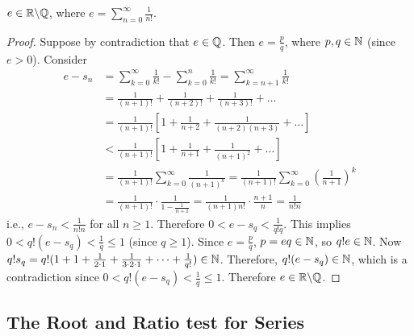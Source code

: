 \documentclass[]{article}
\begin{document}
\begin{theorem}
	$e\in\mathbb{R}\backslash\mathbb{Q}$, where $e = \sum_{n=0}^\infty\frac{1}{n!}$.
\end{theorem}
\begin{proof}
	Suppose by contradiction that $e\in\mathbb{Q}$. Then $e = \frac{p}{q}$, where $p,q\in\mathbb{N}$ (since $e>0$).
	Consider 
	\begin{align*}
		e-s_n &= \sum_{k=0}^\infty\frac{1}{k!}-\sum_{k=0}^n\frac{1}{k!} 
			  = \sum_{k=n+1}^\infty\frac{1}{k!} \\
			  &= \frac{1}{(n+1)!}+\frac{1}{(n+2)!}+\frac{1}{(n+3)!} + \dots \\
			  &= \frac{1}{(n+1)!}\left[1+\frac{1}{n+2}+\frac{1}{(n+2)(n+3)}+\dots\right] \\
			  &< \frac{1}{(n+1)!}\left[1+\frac{1}{n+1}+\frac{1}{(n+1)^2}+\dots\right] \\
			  &= \frac{1}{(n+1)!}\sum_{k=0}^\infty\frac{1}{(n+1)^k} = \frac{1}{(n+1)!}\sum_{k=0}^\infty\left(\frac{1}{n+1}\right)^k \\
			  &= \frac{1}{(n+1)!}\cdot\frac{1}{1-\frac{1}{n+1}} = \frac{1}{(n+1)n!}\cdot\frac{n+1}{n} = \frac{1}{n!n}
	\end{align*}
	i.e., $e-s_n<\frac{1}{n!n}$ for all $n\geq 1$.
	Therefore $0<e-s_q<\frac{1}{q!q}$. This implies $0<q!(e-s_q)<\frac{1}{q} \leq 1$ (since $q\geq 1$).
	Since $e = \frac pq$, $p=eq\in\mathbb{N}$, so $q!e\in\mathbb{N}$.
	Now $q!s_q = q!(1+1+\frac{1}{2\cdot1}+\frac{1}{3\cdot2\cdot1}+\dots+\frac{1}{q!})\in\mathbb{N}$.
	Therefore, $q!(e-s_q)\in\mathbb{N}$, which is a contradiction since $0<q!(e-s_q)<\frac{1}{q}\leq 1$.
	Therefore $e\in\mathbb{R}\backslash\mathbb{Q}$.
\end{proof}

\subsection{The Root and Ratio test for Series}
\end{document}
